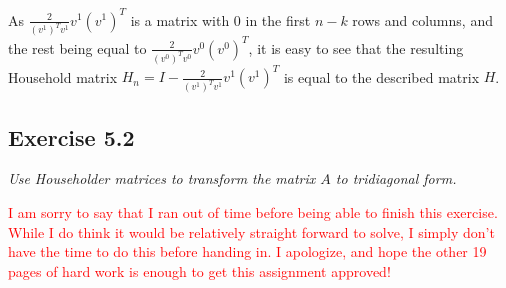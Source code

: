 As $\frac{2}{(v^1)^T v^1} v^1 (v^1)^T$ is a matrix with 0 in the first $n-k$ rows and columns, and the rest being equal to $\frac{2}{(v^0)^T v^0} v^0 (v^0)^T$, it is easy to see that the resulting Household matrix $H_n = I - \frac{2}{(v^1)^T v^1} v^1 (v^1)^T$ is equal to the described matrix $H$. 


\subsection{Exercise 5.2}
\textit{Use Householder matrices to transform the matrix $A$ to tridiagonal form.}

\textcolor{red}{I am sorry to say that I ran out of time before being able to finish this exercise. While I do think it would be relatively straight forward to solve, I simply don't have the time to do this before handing in. I apologize, and hope the other 19 pages of hard work is enough to get this assignment approved!}